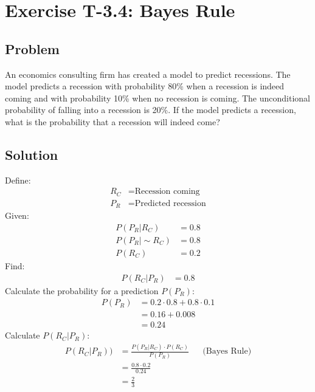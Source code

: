 \section*{Exercise T-3.4: Bayes Rule}

\subsection*{Problem}

An economics consulting firm has created a model to predict recessions. The model predicts a recession with probability 80\% when a recession is indeed coming and with probability 10\% when no recession is coming. The unconditional probability of falling into a recession is 20\%. If the model predicts a recession, what is the probability that a recession will indeed come?

\subsection*{Solution}
Define:
\begin{align}
	R_C &= \text{Recession coming}\nonumber \\
	P_R &= \text{Predicted recession}\nonumber
\end{align}
Given:
\begin{align}
	P(P_R|R_C) &= 0.8 \nonumber \\
	P(P_R|\sim R_C) &= 0.8 \nonumber \\
	P(R_C) &= 0.2 \nonumber
\end{align}
Find:
\begin{align}
	P(R_C|P_R) &= 0.8 \nonumber
\end{align}
Calculate the probability for a prediction $P(P_R)$:
\begin{align}
	P(P_R) &= 0.2 \cdot 0.8 + 0.8 \cdot 0.1 \nonumber \\
	&= 0.16 + 0.008 \nonumber \\
	&= 0.24 \nonumber 
\end{align}
Calculate $P(R_C|P_R)$:
\begin{align}
	P(R_C|P_R)) &= \frac{P(P_R|R_C) \cdot  P(R_C)}{P(P_R)} && \text{(Bayes Rule)} \nonumber \\
	&= \frac{0.8 \cdot 0.2}{0.24} \nonumber \\
	&= \frac{2}{3} \nonumber
\end{align}
